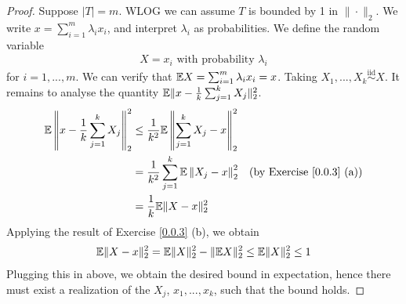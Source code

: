 \begin{proof}
Suppose $|T| = m$. WLOG we can assume $T$ is bounded by 1 in $\|\cdot\|_2$. We write $x = \sum_{i=1}^m\lambda_i x_i$, and interpret $\lambda_i$ as probabilities. We define the random variable
\begin{align*}
    X = x_i \text{ with probability } \lambda_i
\end{align*}
for $i=1,...,m$. We can verify that $\mathbb{E} X = \sum_{i=1}^m \lambda_i x_i = x$. Taking $X_1,...,X_k \overset{\text{iid}}{\sim} X$. It remains to analyse the quantity $\mathbb{E} \|x - \frac 1 k \sum_{j=1}^k X_j\|_2^2$.
\begin{align*}
    \mathbb{E} \left\| x - \frac 1 k \sum_{j=1}^k X_j\right\|_2^2 &\leq \frac{1}{k^2}\mathbb{E} \left\|\sum_{j=1}^k X_j -x\right\|_2^2 \\
    &= \frac{1}{k^2} \sum_{j=1}^k \mathbb{E} \left\| X_j - x \right\|_2^2  &\text{(by Exercise \ref{0.0.3} (a))}\\
    &= \frac 1  k \mathbb{E} \|X - x\|^2_2
\end{align*}
Applying the result of Exercise \ref{0.0.3} (b), we obtain
\begin{align*}
    \mathbb{E} \|X - x\|^2_2 = \mathbb{E}\|X\|_2^2 - \|\mathbb{E} X\|_2^2 \leq \mathbb{E} \|X\|_2^2 \leq 1
\end{align*}
Plugging this in above, we obtain the desired bound in expectation, hence there must exist a realization of the $X_j$, $x_1,...,x_k$, such that the bound holds.


\end{proof}

